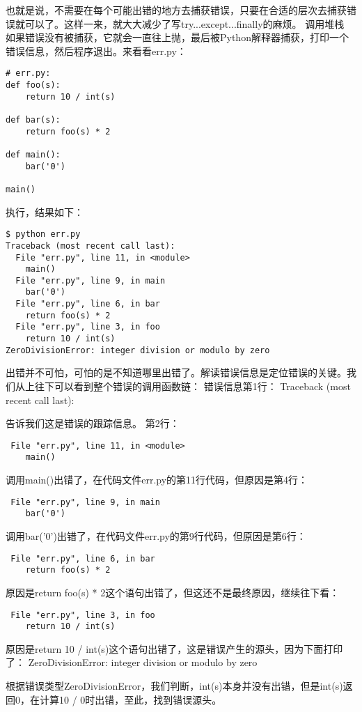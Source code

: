 \documentclass[twoside,11pt]{book}
\begin{document}
也就是说，不需要在每个可能出错的地方去捕获错误，只要在合适的层次去捕获错误就可以了。这样一来，就大大减少了写try...except...finally的麻烦。
调用堆栈
如果错误没有被捕获，它就会一直往上抛，最后被Python解释器捕获，打印一个错误信息，然后程序退出。来看看err.py：
\begin{lstlisting}
# err.py:
def foo(s):
    return 10 / int(s)

def bar(s):
    return foo(s) * 2

def main():
    bar('0')

main()
\end{lstlisting}

执行，结果如下：
\begin{lstlisting}
$ python err.py
Traceback (most recent call last):
  File "err.py", line 11, in <module>
    main()
  File "err.py", line 9, in main
    bar('0')
  File "err.py", line 6, in bar
    return foo(s) * 2
  File "err.py", line 3, in foo
    return 10 / int(s)
ZeroDivisionError: integer division or modulo by zero
\end{lstlisting}

出错并不可怕，可怕的是不知道哪里出错了。解读错误信息是定位错误的关键。我们从上往下可以看到整个错误的调用函数链：
错误信息第1行：
Traceback (most recent call last):

告诉我们这是错误的跟踪信息。
第2行：
\begin{lstlisting}
 File "err.py", line 11, in <module>
    main()
\end{lstlisting}

调用main()出错了，在代码文件err.py的第11行代码，但原因是第4行：
\begin{lstlisting}
 File "err.py", line 9, in main
    bar('0')
\end{lstlisting}

调用bar('0')出错了，在代码文件err.py的第9行代码，但原因是第6行：
\begin{lstlisting}
 File "err.py", line 6, in bar
    return foo(s) * 2
\end{lstlisting}

原因是return foo(s) * 2这个语句出错了，但这还不是最终原因，继续往下看：
\begin{lstlisting}
 File "err.py", line 3, in foo
    return 10 / int(s)
\end{lstlisting}

原因是return 10 / int(s)这个语句出错了，这是错误产生的源头，因为下面打印了：
ZeroDivisionError: integer division or modulo by zero

根据错误类型ZeroDivisionError，我们判断，int(s)本身并没有出错，但是int(s)返回0，在计算10 / 0时出错，至此，找到错误源头。
\end{document}
